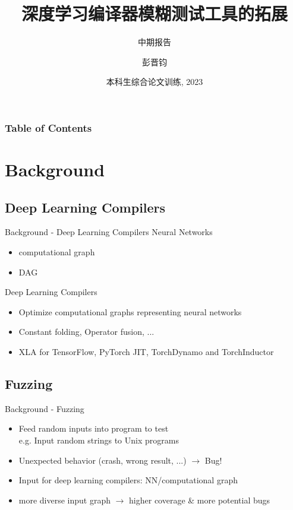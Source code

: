 \documentclass{beamer}
\title[SE x AI] %
{深度学习编译器模糊测试工具的拓展}
\subtitle{中期报告}
\author[] %
{彭晋钧\inst{1}}
\institute[VFU] %
{
  \inst{1}%
  计算机科学与技术系\\
  清华大学\\
  \vspace{1em}
  指导教师：韩文弢\\
  校外指导：Lingming Zhang (UIUC)
}
\date[2023] %
{本科生综合论文训练, 2023}
\begin{document}

\frame{\titlepage}

\begin{frame}
\frametitle{Table of Contents}
\tableofcontents
\end{frame}

\section{Background}

\subsection{Deep Learning Compilers}
\begin{frame}{Background - Deep Learning Compilers}
    Neural Networks
    \begin{itemize}
        \item computational graph
        \item DAG
    \end{itemize}
    Deep Learning Compilers
    \begin{itemize}
        \item Optimize computational graphs representing neural networks
        \item Constant folding, Operator fusion, ...
        \item XLA for TensorFlow, PyTorch JIT, TorchDynamo and TorchInductor
    \end{itemize}
\end{frame}

\subsection{Fuzzing}
\begin{frame}{Background - Fuzzing}
    \begin{itemize}
        \item Feed random inputs into program to test\\
        e.g. Input random strings to Unix programs
        \item Unexpected behavior (crash, wrong result, ...) $\rightarrow$ Bug!
        \item Input for deep learning compilers: NN/computational graph
        \item more diverse input graph $\rightarrow$ higher coverage \& more potential bugs
    \end{itemize}
\end{frame}
\end{document}
